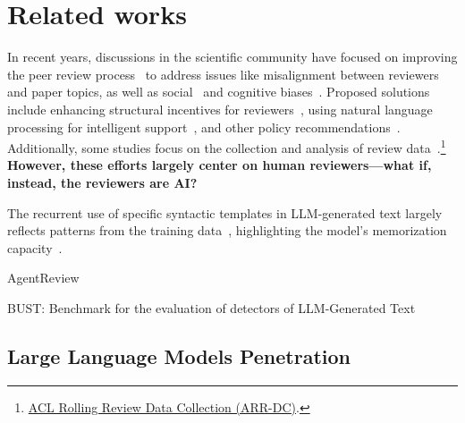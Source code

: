 

\section{Related works}




In recent years, discussions in the scientific community have focused on improving the peer review process~\cite{gurevych_et_al:DagRep.14.1.130, kuznetsov2024natural} to address issues like misalignment between reviewers and paper topics, as well as social~\cite{huber2022nobel, tomkins2017reviewer, manzoor2021uncovering} and cognitive biases~\cite{lee2015commensuration, stelmakh2021prior}. Proposed solutions include enhancing structural incentives for reviewers~\cite{rogers-augenstein-2020-improve}, using natural language processing for intelligent support~\cite{kuznetsov-etal-2022-revise, zyska-etal-2023-care, dycke-etal-2023-nlpeer, guo-etal-2023-automatic, kumar-etal-2023-reviewers}, and other policy recommendations~\cite{dycke-etal-2022-yes}. Additionally, some studies focus on the collection and analysis of review data~\cite{kennard-etal-2022-disapere, staudinger-etal-2024-analysis, darcy-etal-2024-aries}.\footnote{\href{https://arr-data.aclweb.org/}{ACL Rolling Review Data Collection (ARR-DC)}.} 
\textbf{However, these efforts largely center on human reviewers—what if, instead, the reviewers are AI?}


The recurrent use of specific syntactic templates in LLM-generated text largely reflects patterns from the training data~\cite{shaib-etal-2024-detection}, highlighting the model's memorization capacity~\cite{karamolegkou-etal-2023-copyright, zeng-etal-2024-exploring, zhu-etal-2024-beyond}.






AgentReview~\cite{jin2024agentreview}

BUST: Benchmark for the evaluation of detectors of LLM-Generated Text~\cite{cornelius-etal-2024-bust}


\subsection{Large Language Models Penetration}



